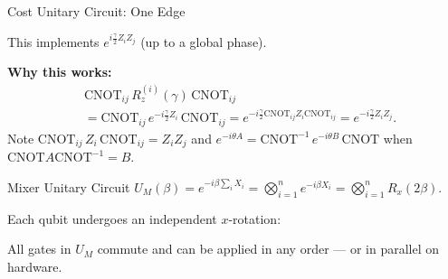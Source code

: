 \documentclass{beamer}
\begin{document}
\begin{frame}
\begin{frame}{Cost Unitary Circuit: One Edge}
\centering
{}

\medskip
\raggedright
This implements $e^{i\frac{\gamma}{2}Z_iZ_j}$ (up to a global phase).

\medskip

\textbf{Why this works:}
\begin{align*}
&\mathrm{CNOT}_{ij}\,R_z^{(i)}(\gamma)\,\mathrm{CNOT}_{ij}\\
&= \mathrm{CNOT}_{ij}\,e^{-i\frac{\gamma}{2}Z_i}\,\mathrm{CNOT}_{ij}
= e^{-i\frac{\gamma}{2}\mathrm{CNOT}_{ij}Z_i\mathrm{CNOT}_{ij}}
= e^{-i\frac{\gamma}{2}Z_iZ_j}.
\end{align*}
Note $\mathrm{CNOT}_{ij}\,Z_i\,\mathrm{CNOT}_{ij} = Z_i Z_j$ and
$e^{-i\theta A} = \mathrm{CNOT}^{-1}\,e^{-i\theta B}\,\mathrm{CNOT}$
when $\mathrm{CNOT}A\mathrm{CNOT}^{-1}=B$.
\end{frame}


\begin{frame}{Mixer Unitary Circuit}
$U_M(\beta) = e^{-i\beta\sum_i X_i}
= \bigotimes_{i=1}^n e^{-i\beta X_i}
= \bigotimes_{i=1}^n R_x(2\beta).$

Each qubit undergoes an independent $x$-rotation:

\medskip
\centering
{}

\medskip
\raggedright
All gates in $U_M$ commute and can be applied in any order --- or in
parallel on hardware.
\end{frame}


\end{frame}
\end{document}
